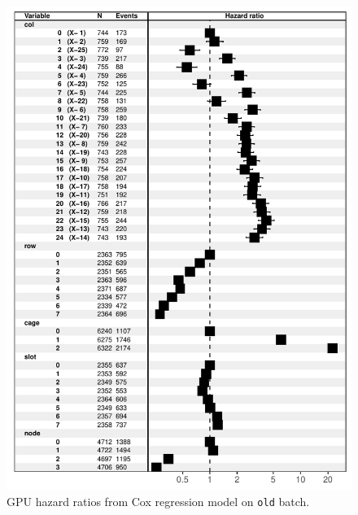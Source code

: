 \begin{figure}
  \includegraphics[width=5in]{figs/cox_o001.pdf}
  \caption{GPU hazard ratios from Cox regression model on {\tt old}
    batch.}
\end{figure}

